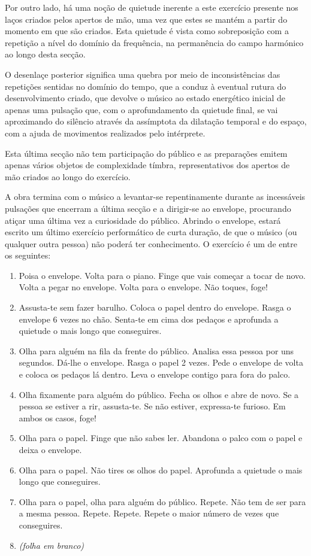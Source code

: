 \documentclass[../main.tex]{subfiles}
\begin{document}
Por outro lado, há uma noção de quietude inerente a este exercício presente nos laços criados pelos apertos de mão, uma vez que estes se mantém a partir do momento em que são criados. Esta quietude é vista como sobreposição com a repetição a nível do domínio da frequência, na permanência do campo harmónico ao longo desta secção.

O desenlaçe posterior significa uma quebra por meio de inconsistências das repetições sentidas no domínio do tempo, que a conduz à eventual rutura do desenvolvimento criado, que devolve o músico ao estado energético inicial de apenas uma pulsação que, com o aprofundamento da quietude final, se vai aproximando do silêncio através da assímptota da dilatação temporal e do espaço, com a ajuda de movimentos realizados pelo intérprete.

Esta última secção não tem participação do público e as preparações emitem apenas vários objetos de complexidade tímbra, representativos dos apertos de mão criados ao longo do exercício.

A obra termina com o músico a levantar-se repentinamente durante as incessáveis pulsações que encerram a última secção e a dirigir-se ao envelope, procurando atiçar uma última vez a curiosidade do público. Abrindo o envelope, estará escrito um último exercício performático de curta duração, de que o músico (ou qualquer outra pessoa) não poderá ter conhecimento. O exercício é um de entre os seguintes:
\begin{enumerate}
    \item Poisa o envelope. Volta para o piano. Finge que vais começar a tocar de novo. Volta a pegar no envelope. Volta para o envelope. Não toques, foge!
    \item Assusta-te sem fazer barulho. Coloca o papel dentro do envelope. Rasga o envelope 6 vezes no chão. Senta-te em cima dos pedaços e aprofunda a quietude o mais longo que conseguires.
    \item Olha para alguém na fila da frente do público. Analisa essa pessoa por uns segundos. Dá-lhe o envelope. Rasga o papel 2 vezes. Pede o envelope de volta e coloca os pedaços lá dentro. Leva o envelope contigo para fora do palco.
    \item Olha fixamente para alguém do público. Fecha os olhos e abre de novo. Se a pessoa se estiver a rir, assusta-te. Se não estiver, expressa-te furioso. Em ambos os casos, foge!
    \item Olha para o papel. Finge que não sabes ler. Abandona o palco com o papel e deixa o envelope.
    \item Olha para o papel. Não tires os olhos do papel. Aprofunda a quietude o mais longo que conseguires.
    \item Olha para o papel, olha para alguém do público. Repete. Não tem de ser para a mesma pessoa. Repete. Repete. Repete o maior número de vezes que conseguires.
    \item \textsl{(folha em branco)}
\end{enumerate}
\end{document}
